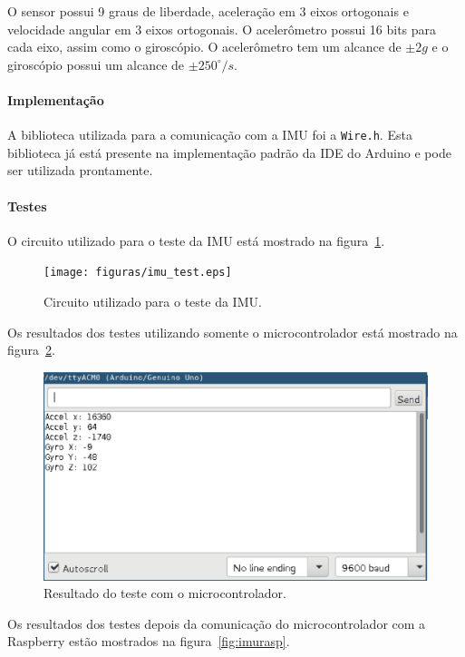 	O sensor possui 9 graus de liberdade, aceleração em 3 eixos ortogonais
	e velocidade angular em 3 eixos ortogonais.
	O acelerômetro possui 16 bits para cada eixo, assim como o giroscópio.
	O acelerômetro tem um alcance de $\pm 2g$ e o giroscópio
	possui um alcance de $\pm 250^{\circ}/s$.

	\paragraph{Implementação}

	A biblioteca utilizada para a comunicação com a IMU foi a \texttt{Wire.h}.
	Esta biblioteca já está presente na implementação padrão da IDE do Arduino
	e pode ser utilizada prontamente.

	\newpage
	\paragraph{Testes}

	O circuito utilizado para o teste da IMU está mostrado na figura~\ref{fig:imutest}.

	\begin{figure}[!htbp]
	\begin{center}
	\texttt{[image: figuras/imu\_test.eps]}
	\caption{\label{fig:imutest}Circuito utilizado para o teste da IMU.}
	\end{center}
	\end{figure}

	Os resultados dos testes utilizando somente o microcontrolador está mostrado na
	figura~\ref{fig:imuardu}.

	\begin{figure}[!htbp]
	\begin{center}
	\includegraphics[width=.7\textwidth]{figuras/imu_arduino.eps}
	\caption{\label{fig:imuardu}Resultado do teste com o microcontrolador.}
	\end{center}
	\end{figure}

	Os resultados dos testes depois da comunicação do microcontrolador com a
	Raspberry estão mostrados na figura~\ref{fig:imurasp}.

